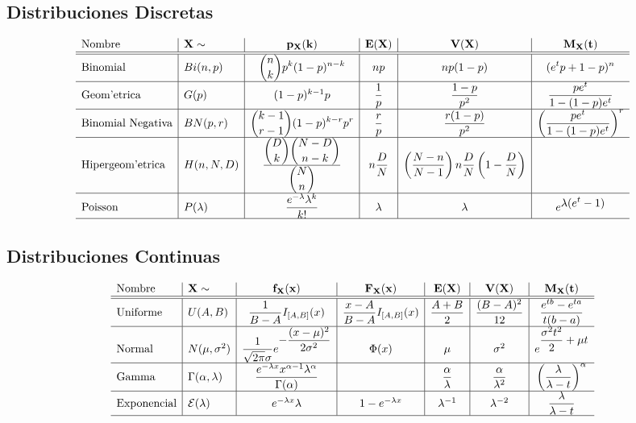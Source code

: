 \documentclass[a4paper,spanish]{article}
\newcommand{\bigfrac}[2]{\displaystyle\frac{#1}{#2}}
\newcommand{\bigchoose}[0]{\displaystyle\choose}
\newcommand{\expon}[0]{{\cal E}}
\begin{document}
\subsection{Distribuciones Discretas}
$$
\begin{array}{l|l|c|c|c|c}
\mathbf{\mbox{Nombre}} & \mathbf{X \sim} & \mathbf{p_X(k)}
	& \mathbf{E(X)} & \mathbf{V(X)} &  \mathbf{M_X(t)} \\\hline\hline
\mbox{Binomial} & Bi(n,p) & \displaystyle {n \choose k}p^k(1-p)^{n-k} & 
	np & np(1-p) & \displaystyle (e^t p + 1 - p)^n \\\hline
\mbox{Geom'etrica} & G(p) & (1-p)^{k-1}p & \bigfrac{1}{p} & \bigfrac{1-p}{p^2}
	& \bigfrac{pe^t}{1-(1-p)e^t}\\\hline
\mbox{Binomial Negativa} & BN(p,r) & 
	\displaystyle {k-1 \choose r-1} (1-p)^{k-r}p^r &
	\bigfrac{r}{p} & \bigfrac{r(1-p)}{p^2} & 
	\left(\bigfrac{p e^t}{1 - (1-p)e^t}\right)^r \\\hline
\mbox{Hipergeom'etrica} & H(n,N,D) & 
	\frac{ \displaystyle {D \bigchoose k} {N-D \bigchoose n-k} }
		 { \displaystyle {N \bigchoose n}  } & n\bigfrac{D}{N} &
	\left(\bigfrac{N-n}{N-1}\right)n\bigfrac{D}{N}\left(1-\bigfrac{D}{N}\right)
	\\\hline
\mbox{Poisson} & P(\lambda) & \bigfrac{e^{-\lambda} \lambda^k}{k!} & 
	\lambda & \lambda & e^{\displaystyle \lambda (e^t - 1)}\\\hline
\end{array}
$$

\subsection{Distribuciones Continuas}

$$
\begin{array}{l|l|c|c|c|c|c}
\mathbf{\mbox{Nombre}} & \mathbf{X \sim} & \mathbf{f_X(x)} & \mathbf{F_X(x)} &
	\mathbf{E(X)} & \mathbf{V(X)} & \mathbf{M_X(t)} \\\hline\hline
\mbox{Uniforme} & U(A,B) & \bigfrac{1}{B-A} I_{[A,B]}(x) & 
	\bigfrac{x-A}{B-A} I_{[A,B]}(x) & \bigfrac{A+B}{2} & 
	\bigfrac{(B-A)^2}{12} & \bigfrac{e^{tb} - e^{ta}}{t(b - a)} \\\hline
\mbox{Normal} & N(\mu,\sigma^2) & \bigfrac{1}{\sqrt{2 \pi} \sigma} 
	e ^ {\displaystyle -\frac{(x-\mu)^2}{2 \sigma^2}} & \Phi(x)
	& \mu & \sigma^2 & e^{\bigfrac{\sigma^2 t^2}{2}+\mu t }\\\hline
\mbox{Gamma} & \Gamma(\alpha,\lambda) & 
	\bigfrac{e^{-\lambda x} x^{\alpha-1} \lambda^\alpha}{\Gamma(\alpha)} &
	& \bigfrac{\alpha}{\lambda} & \bigfrac{\alpha}{\lambda^2} 
	& \left(\bigfrac{\lambda}{\lambda - t}\right)^\alpha \\\hline
\mbox{Exponencial} & \expon(\lambda) & 
	e^{-\lambda x} \lambda & 1-e^{-\lambda x} &
	\lambda^{-1} & \lambda^{-2} & \bigfrac{\lambda}{\lambda - t} \\\hline
\end{array}
$$
\end{document}
